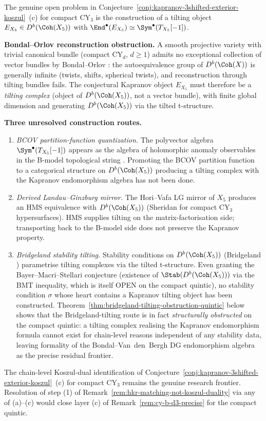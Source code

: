 \begin{remark}
\label{rem:tilting-complex-obstruction-quintic}
The genuine open problem in
Conjecture~\ref{conj:kapranov-3shifted-exterior-koszul}~(c) for compact
CY$_3$ is the construction of a tilting object $E_{X_5}\in D^b(\Coh(X_5))$
with $\End^\bullet(E_{X_5})\simeq \Sym^\bullet(T_{X_5}[-1])$.

\textbf{Bondal--Orlov reconstruction obstruction.} A smooth projective
variety with trivial canonical bundle (compact CY$_d$, $d\geq 1$) admits
no exceptional collection of vector bundles by Bondal--Orlov
\cite{BondalOrlov2001}: the autoequivalence group of $D^b(\Coh(X))$ is
generally infinite (twists, shifts, spherical twists), and reconstruction
through tilting bundles fails. The conjectural Kapranov object $E_{X_5}$
must therefore be a \emph{tilting complex} (object of $D^b(\Coh(X_5))$,
not a vector bundle), with finite global dimension and generating
$D^b(\Coh(X_5))$ via the tilted t-structure.

\textbf{Three unresolved construction routes.}
\begin{enumerate}[label=\textup{(\alph*)}]
 \item \emph{BCOV partition-function quantization.} The polyvector algebra
 $\Sym^\bullet(T_{X_5}[-1])$ appears as the algebra of holomorphic anomaly
 observables in the B-model topological string \cite{BCOV1993}. Promoting
 the BCOV partition function to a categorical structure on
 $D^b(\Coh(X_5))$ producing a tilting complex with the Kapranov endomorphism
 algebra has not been done.
 \item \emph{Derived Landau--Ginzburg mirror.} The Hori--Vafa LG mirror
 of $X_5$ produces an HMS equivalence with $D^b(\Coh(X_5))$
 (Sheridan \cite{Sheridan2015} for compact CY$_3$ hypersurfaces). HMS
 supplies tilting on the matrix-factorisation side; transporting back to
 the B-model side does not preserve the Kapranov property.
 \item \emph{Bridgeland stability tilting.} Stability conditions on
 $D^b(\Coh(X_5))$ (Bridgeland \cite{Bridgeland2007}) parametrise tilting
 complexes via the tilted t-structure. Even granting the Bayer--Macri--Stellari
 conjecture (existence of $\Stab(D^b(\Coh(X_5)))$ via the BMT inequality,
 which is itself OPEN on the compact quintic), no stability condition
 $\sigma$ whose heart contains a Kapranov tilting object has been
 constructed. Theorem~\ref{thm:bridgeland-tilting-obstruction-quintic}
 below shows that the Bridgeland-tilting route is in fact \emph{structurally
 obstructed} on the compact quintic: a tilting complex realising the
 Kapranov endomorphism formula cannot exist for chain-level reasons
 independent of any stability data, leaving formality of the
 Bondal--Van~den~Bergh DG endomorphism algebra as the precise residual
 frontier.
\end{enumerate}
The chain-level Koszul-dual identification of
Conjecture~\ref{conj:kapranov-3shifted-exterior-koszul}~(c) for compact
CY$_3$ remains the genuine research frontier. Resolution of step (1) of
Remark~\ref{rem:hkr-matching-not-koszul-duality} via any of (a)--(c)
would close layer (c) of Remark~\ref{rem:cy-b-d3-precise} for the
compact quintic.


\end{remark}

